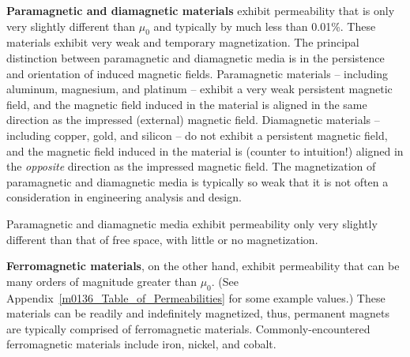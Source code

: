 {\bf Paramagnetic and diamagnetic materials} 
exhibit permeability that is only very slightly different than $\mu_0$ and typically by much less than 0.01\%.
These materials exhibit very weak and temporary magnetization.
The principal distinction between paramagnetic and diamagnetic media is in the persistence and orientation of induced magnetic fields.
Paramagnetic materials -- including aluminum, 
magnesium, 
and platinum 
-- exhibit a very weak persistent magnetic field, and the magnetic field induced in the material is aligned in the same direction as the impressed (external) magnetic field. 
Diamagnetic materials -- including copper, 
gold, 
and silicon
-- do not exhibit a persistent magnetic field, and the magnetic field induced in the material is (counter to intuition!) aligned in the \emph{opposite} direction as the impressed magnetic field.
The magnetization of paramagnetic and diamagnetic media is typically so weak that it is not often a consideration in engineering analysis and design.

\begin{mdframed}[backgroundcolor=yellow!20] 
Paramagnetic and diamagnetic media exhibit permeability only very slightly different than that of free space, with little or no magnetization.
\end{mdframed}

{\bf Ferromagnetic materials}, 
on the other hand, exhibit permeability that can be many orders of magnitude greater than $\mu_0$. 
(See Appendix~\ref{m0136_Table_of_Permeabilities} for some example values.)
These materials can be readily and indefinitely magnetized, thus, permanent magnets are typically comprised of ferromagnetic materials.
Commonly-encountered ferromagnetic materials include iron, 
nickel, 
and cobalt.


